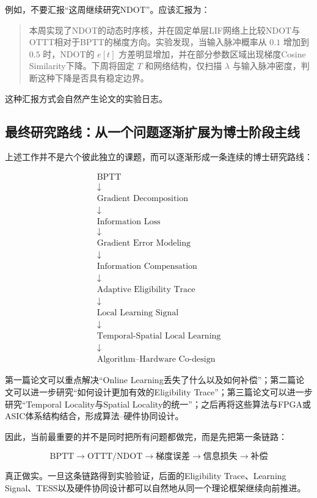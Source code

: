 \documentclass[journal,12pt,onecolumn]{IEEEtran}
\begin{document}
例如，不要汇报“这周继续研究NDOT”。应该汇报为：

\begin{quote}
本周实现了NDOT的动态时序核，并在固定单层LIF网络上比较NDOT与OTTT相对于BPTT的梯度方向。实验发现，当输入脉冲概率从 \(0.1\) 增加到 \(0.5\) 时，NDOT的 \(e[t]\) 方差明显增加，并在部分参数区域出现梯度Cosine Similarity下降。下周将固定 \(T\) 和网络结构，仅扫描 \(\lambda\) 与输入脉冲密度，判断这种下降是否具有稳定边界。
\end{quote}

这种汇报方式会自然产生论文的实验日志。


\subsection{最终研究路线：从一个问题逐渐扩展为博士阶段主线}

上述工作并不是六个彼此独立的课题，而可以逐渐形成一条连续的博士研究路线：

\[
\boxed{
\begin{array}{c}
\text{BPTT}\\
\downarrow\\
\text{Gradient Decomposition}\\
\downarrow\\
\text{Information Loss}\\
\downarrow\\
\text{Gradient Error Modeling}\\
\downarrow\\
\text{Information Compensation}\\
\downarrow\\
\text{Adaptive Eligibility Trace}\\
\downarrow\\
\text{Local Learning Signal}\\
\downarrow\\
\text{Temporal-Spatial Local Learning}\\
\downarrow\\
\text{Algorithm--Hardware Co-design}
\end{array}
}
\]

第一篇论文可以重点解决“Online Learning丢失了什么以及如何补偿”；第二篇论文可以进一步研究“如何设计更加有效的Eligibility Trace”；第三篇论文可以进一步研究“Temporal Locality与Spatial Locality的统一”；之后再将这些算法与FPGA或ASIC体系结构结合，形成算法--硬件协同设计。

因此，当前最重要的并不是同时把所有问题都做完，而是先把第一条链路：

\[
\boxed{
\text{BPTT}
\rightarrow
\text{OTTT/NDOT}
\rightarrow
\text{梯度误差}
\rightarrow
\text{信息损失}
\rightarrow
\text{补偿}
}
\]

真正做实。一旦这条链路得到实验验证，后面的Eligibility Trace、Learning Signal、TESS以及硬件协同设计都可以自然地从同一个理论框架继续向前推进。




\end{document}
